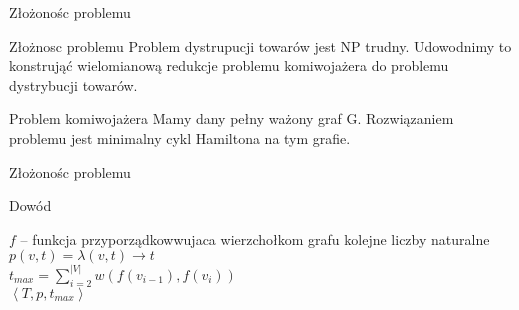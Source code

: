 \begin{frame}{Złożonośc problemu}
	
	\begin{block}{Złożnosc problemu}
		Problem dystrupucji towarów jest NP trudny.
		Udowodnimy to konstrująć wielomianową redukcje problemu komiwojażera do problemu dystrybucji towarów.
	\end{block}

	\begin{block}{Problem komiwojażera}
		Mamy dany pełny ważony graf G. Rozwiązaniem problemu jest minimalny cykl Hamiltona na tym grafie.
	\end{block}

\end{frame}

\begin{frame}{Złożonośc problemu}
	
	\begin{block}{Dowód}
		
		\begin{algorithm}[H]
			$f$ -- funkcja przyporządkowwujaca wierzchołkom grafu kolejne liczby naturalne \\
			$p(v, t) = \lambda\left( v, t \right) \rightarrow t$ \\
			$t_{max} = \sum\limits_{i=2}^{|V|} w(f(v_{i-1}), f(v_i))$ \\
			\Return $\left< T, p , t_{max} \right> $
		\end{algorithm}
	
	\end{block}

\end{frame}
